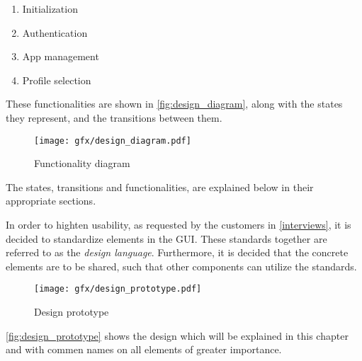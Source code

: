 \begin{enumerate}
	\item Initialization
	\item Authentication
	\item App management
	\item Profile selection
\end{enumerate}

These functionalities are shown in \autoref{fig:design_diagram}, along with the states they represent, and the transitions between them.

\begin{figure}[h!]
	\centering
	\texttt{[image: gfx/design\_diagram.pdf]}
	\caption{Functionality diagram}
	\label{fig:design_diagram}
\end{figure}

The states, transitions and functionalities, are explained below in their appropriate sections.

In order to highten usability, as requested by the customers in \autoref{interviews}, it is decided to standardize elements in the GUI. These standards together are referred to as the \emph{design language}.
Furthermore, it is decided that the concrete elements are to be shared, such that other \giraf[] components can utilize the standards.

\begin{figure}[h!]
	\centering
	\texttt{[image: gfx/design\_prototype.pdf]}
	\caption{Design prototype}
	\label{fig:design_prototype}
\end{figure}

\autoref{fig:design_prototype} shows the design which will be explained in this chapter and with commen names on all elements of greater importance.